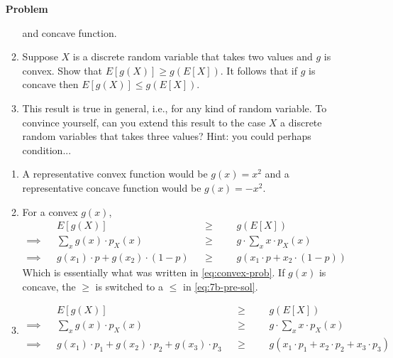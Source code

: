 \documentclass[12pt]{article}
\newenvironment{Ex}{\textbf{Problem}\vspace{.75em}\\}{}
\begin{document}
\begin{enumerate}
\begin{Ex}
\begin{enumerate}
        and concave function.
      \item Suppose $X$ is a discrete random variable that takes two
        values and $g$ is convex. Show that $E[g(X)] \ge g(E[X])$. It
        follows that if $g$ is concave then $E[g(X)] \le g(E[X])$.
      \item This result is true in general, i.e., for any kind of
        random variable. To convince yourself, can you extend this
        result to the case $X$ a discrete random variables that takes
        three values? Hint: you could perhaps condition...
      \end{enumerate}
      \begin{solution} \hfill
        \begin{enumerate}
        \item A representative convex function would be $g(x) = x^2$
          and a representative concave function would be $g(x) = -x^2$.
        \item For a convex $g(x)$,
          \begin{equation}
            \label{eq:7b-pre-sol}
            \begin{aligned}
              && E[g(X)] &&\ge&&& g(E[X]) \\
              \implies && \sum_x g(x) \cdot p_X(x) &&\ge&&&
              g\cdot\sum_x x \cdot p_X(x) \\
              \implies && g(x_1) \cdot p + g(x_2) \cdot (1-p) &&\ge&&&
              g(x_1 \cdot p + x_2 \cdot (1-p))
            \end{aligned}
          \end{equation}
          Which is essentially what was written in
          \cref{eq:convex-prob}. If $g(x)$ is concave, the $\ge$ is
          switched to a $\le$ in \cref{eq:7b-pre-sol}.
        \item
          \begin{equation}
            \label{eq:7c-pre-sol}
            \begin{aligned}
              && E[g(X)] &&\ge&&& g(E[X]) \\
              \implies && \sum_x g(x) \cdot p_X(x) &&\ge&&&
              g\cdot\sum_x x \cdot p_X(x) \\
              \implies && g(x_1) \cdot p_1 + g(x_2) \cdot p_2 + g(x_3)
              \cdot p_3 &&\ge&&& g(x_1 \cdot p_1 + x_2 \cdot p_2 + x_3
              \cdot p_3) \\
            \end{aligned}
          \end{equation}

\end{enumerate}
\end{solution}
\end{Ex}
\end{enumerate}
\end{document}
